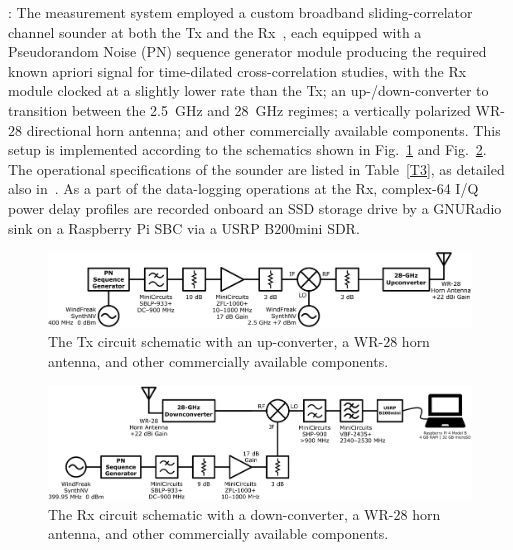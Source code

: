 \documentclass[12pt, draftcls, onecolumn]{IEEEtran}
\begin{document}
: The measurement system employed a custom broadband sliding-correlator channel sounder at both the Tx and the Rx~\cite{Purdue}, each equipped with a Pseudorandom Noise (PN) sequence generator module producing the required known apriori signal for time-dilated cross-correlation studies, with the Rx module clocked at a slightly lower rate than the Tx; an up-/down-converter to transition between the \SI{2.5}{\giga\hertz} and \SI{28}{\giga\hertz} regimes; a vertically polarized WR-$28$ directional horn antenna; and other commercially available components. This setup is implemented according to the schematics shown in Fig.~\ref{F2a} and Fig.~\ref{F2b}. The operational specifications of the sounder are listed in Table~\ref{T3}, as detailed also in~\cite{Purdue}. As a part of the data-logging operations at the Rx, complex-\SI{64}{} I/Q power delay profiles are recorded onboard an SSD storage drive by a GNURadio sink on a Raspberry Pi SBC via a USRP B$200$mini SDR.
\begin{figure} [t]
    \centering
    \includegraphics[width=1.0\linewidth]{figs/tx_schematic.png}
    \vspace{-8mm}
    \caption{The Tx circuit schematic with an up-converter, a WR-$28$ horn antenna, and other commercially available components.}
    \label{F2a}
    \vspace{-6mm}
\end{figure}
\begin{figure} [t]
    \centering
    \includegraphics[width=1.0\linewidth]{figs/rx_schematic.png}
    \vspace{-8mm}
    \caption{The Rx circuit schematic with a down-converter, a WR-$28$ horn antenna, and other commercially available components.}
    \label{F2b}
\end{figure}
\end{document}
